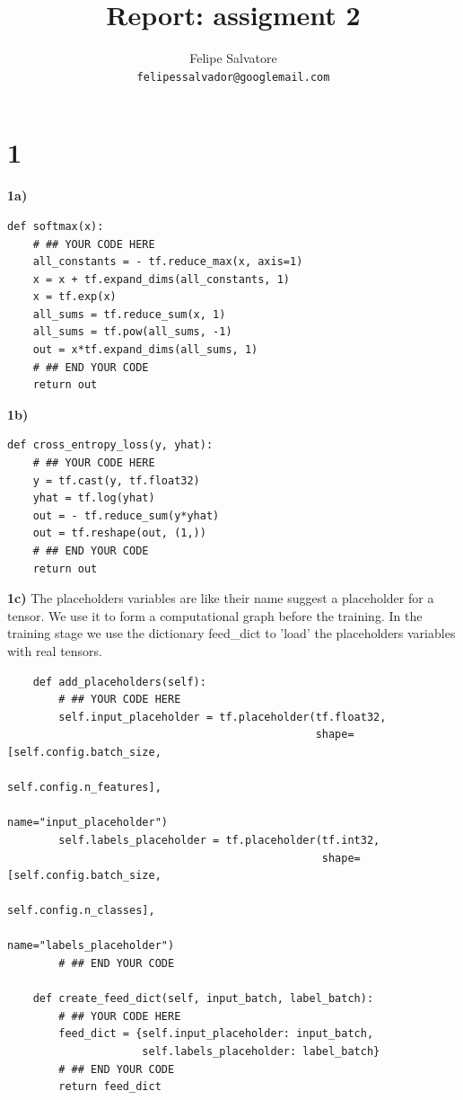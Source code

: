 \documentclass{article}
\title{Report: assigment 2}
\author{Felipe Salvatore\\
\texttt{felipessalvador@googlemail.com}}
\begin{document}
\maketitle
\section{1}
\textbf{1a)} 
\begin{verbatim}
def softmax(x):
    # ## YOUR CODE HERE
    all_constants = - tf.reduce_max(x, axis=1)
    x = x + tf.expand_dims(all_constants, 1)
    x = tf.exp(x)
    all_sums = tf.reduce_sum(x, 1)
    all_sums = tf.pow(all_sums, -1)
    out = x*tf.expand_dims(all_sums, 1)
    # ## END YOUR CODE
    return out
\end{verbatim}


\textbf{1b)}
\begin{verbatim}
def cross_entropy_loss(y, yhat):
    # ## YOUR CODE HERE
    y = tf.cast(y, tf.float32)
    yhat = tf.log(yhat)
    out = - tf.reduce_sum(y*yhat)
    out = tf.reshape(out, (1,))
    # ## END YOUR CODE
    return out
\end{verbatim}

\textbf{1c)} The placeholders variables are like their name suggest a placeholder for a tensor. We use it to form a computational graph before the training. In the training stage we use the dictionary feed\_dict to 'load' the placeholders variables with real tensors.

\begin{verbatim}
    def add_placeholders(self):
        # ## YOUR CODE HERE
        self.input_placeholder = tf.placeholder(tf.float32,
                                                shape=[self.config.batch_size,
                                                       self.config.n_features],
                                                name="input_placeholder")
        self.labels_placeholder = tf.placeholder(tf.int32,
                                                 shape=[self.config.batch_size,
                                                        self.config.n_classes],
                                                 name="labels_placeholder")
        # ## END YOUR CODE

    def create_feed_dict(self, input_batch, label_batch):
        # ## YOUR CODE HERE
        feed_dict = {self.input_placeholder: input_batch,
                     self.labels_placeholder: label_batch}
        # ## END YOUR CODE
        return feed_dict
\end{verbatim}
\end{document}
